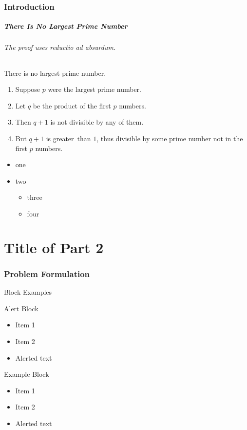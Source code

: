 \documentclass[hyperref={pdfpagelabels=false},aspectratio=169]{beamer}
\begin{document}
\section{Introduction}
\begin{frame}
	\frametitle{There Is No Largest Prime Number} 
	\framesubtitle{The proof uses \textit{reductio ad absurdum}.} 
	\begin{theorem}
		There is no largest prime number.  \end{theorem} 
	\begin{enumerate} 
		\item<1-| alert@1> Suppose $p$ were the largest prime number. 
		\item<2-> Let $q$ be the product of the first $p$ numbers. 
		\item<3-> Then $q+1$ is not divisible by any of them. 
		\item<1-> But $q + 1$ is \color{KIOSred}greater\color{KIOSgray}\ than $1$, thus divisible by some prime
		number not in the first $p$ numbers.
		
	\end{enumerate}
	
	\begin{itemize}
		\item one
		\item two 
		\begin{itemize}
			\item three
			\item four
		\end{itemize}
	\end{itemize} 
\end{frame}

\part{Title of Part 2}
\frame{\partpage}
\section{Problem Formulation}
\begin{frame} {Block Examples}
	\begin{alertblock}{Alert Block}
		\begin{itemize}
			\item Item 1
			\item Item 2
			\item \alert{Alerted text}
	\end{itemize}	
\end{alertblock}
	\begin{example}{Example Block}
	\begin{itemize}
		\item Item 1
		\item Item 2
		\item \alert{Alerted text}
	\end{itemize}	
\end{example}

\end{frame}
\end{document}
